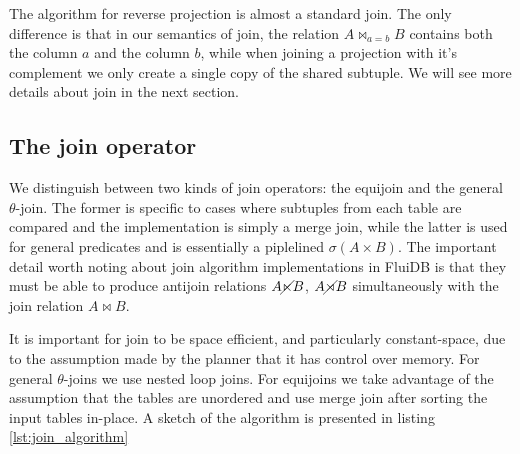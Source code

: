 The algorithm for reverse projection is almost a standard join. The
only difference is that in our semantics of join, the relation \(A
\Join_{a = b} B\) contains both the column \(a\) and the column \(b\),
while when joining a projection with it's complement we only create a
single copy of the shared subtuple. We will see more details about
join in the next section.


\subsection{The join operator}

We distinguish between two kinds of join operators: the equijoin and
the general \(\theta\)-join. The former is specific to cases where
subtuples from each table are compared and the implementation is
simply a merge join, while the latter is used for general predicates
and is essentially a piplelined \(\sigma(A \times B)\). The important
detail worth noting about join algorithm implementations in FluiDB is
that they must be able to produce antijoin relations \(A \cancel\ltimes B\),
\(A \cancel\rtimes B\) simultaneously with the join relation \(A \Join B\).

It is important for join to be space efficient, and particularly
constant-space, due to the assumption made by the planner that it has
control over memory. For general \(\theta\)-joins we use nested loop
joins. For equijoins we take advantage of the assumption that the
tables are unordered and use merge join after sorting the input tables
in-place. A sketch of the algorithm is presented in listing
\ref{lst:join_algorithm}

